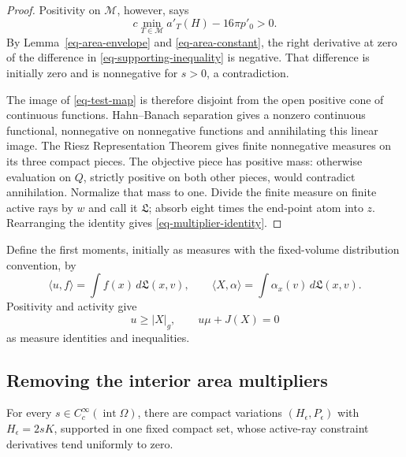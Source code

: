 \begin{proof}
Positivity on \(\mathcal M\), however, says
\[
 c\min_{T\in\mathcal M}a'_T(H)-16\pi p'_0>0.
\]
By Lemma~\ref{eq-area-envelope} and \eqref{eq-area-constant}, the
right derivative at zero of the difference in
\eqref{eq-supporting-inequality} is negative.  That difference is
initially zero and is nonnegative for \(s>0\), a contradiction.

The image of \eqref{eq-test-map} is therefore disjoint from the open
positive cone of continuous functions.  Hahn--Banach separation
gives a nonzero continuous functional, nonnegative on nonnegative
functions and annihilating this linear image.  The Riesz
Representation Theorem gives finite nonnegative measures on its
three compact pieces.  The objective piece has positive mass:
otherwise evaluation on \(Q\), strictly positive on both other
pieces, would contradict annihilation.  Normalize that mass to one.
Divide the finite measure on finite active rays by \(w\) and call
it \(\mathfrak L\); absorb eight times the end-point atom into \(z\).
Rearranging the identity gives \eqref{eq-multiplier-identity}.
\end{proof}

Define the first moments, initially as measures with the fixed-volume
distribution convention, by
\[
 \langle u,f\rangle=\int f(x)\,d\mathfrak L(x,v),\qquad
 \langle X,\alpha\rangle=\int\alpha_x(v)\,d\mathfrak L(x,v).
\]
Positivity and activity give
\begin{equation}
 u\geq |X|_g,\qquad u\mu+J(X)=0
 \label{eq-measure-complementarity}
\end{equation}
as measure identities and inequalities.

\subsection{Removing the interior area multipliers}

\begin{lemma}
\label{eq-normal-tests}
For every \(s\in C_c^\infty(\operatorname{int}\Omega)\), there are
compact variations \((H_\epsilon,P_\epsilon)\) with
\(H_\epsilon=2sK\), supported in one fixed compact set, whose
active-ray constraint derivatives tend uniformly to zero.
\end{lemma}

